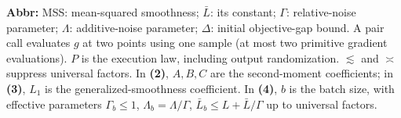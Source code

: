 \begin{table}[tp]
\begin{threeparttable}
\begin{tablenotes}[flushleft]
\item[] \textbf{Abbr:} MSS: mean-squared smoothness; $\bar L$: its constant; $\Gamma$: relative-noise parameter; $\Lambda$: additive-noise parameter; $\Delta$: initial objective-gap bound. A pair call evaluates $g$ at two points using one sample (at most two primitive gradient evaluations). $P$ is the execution law, including output randomization. $\lesssim$ and $\asymp$ suppress universal factors. In \textbf{(2)}, $A,B,C$ are the second-moment coefficients; in \textbf{(3)}, $L_1$ is the generalized-smoothness coefficient. In \textbf{(4)}, $b$ is the batch size, with effective parameters $\Gamma_b\le1$, $\Lambda_b=\Lambda/\Gamma$, $\bar L_b\le L+\bar L/\Gamma$ up to universal factors.
\end{tablenotes}
\end{threeparttable}
\end{table}
\clearpage
